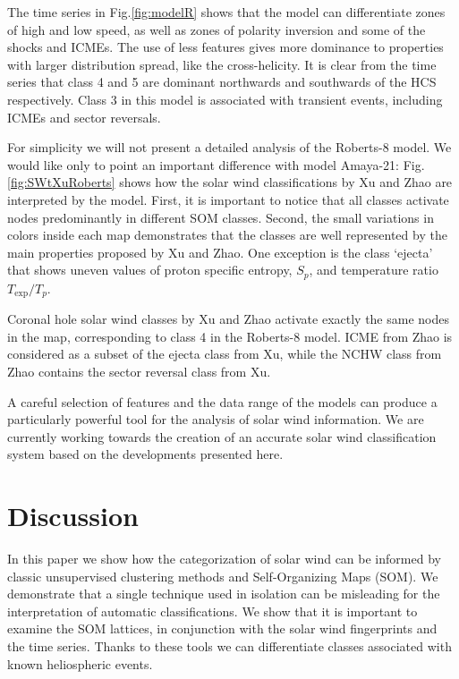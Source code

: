 \documentclass[utf8]{frontiersSCNS} %
\begin{document}
The time series in Fig.\ref{fig:modelR} shows that the model can differentiate zones of high and low speed, as well as zones of polarity inversion and some of the shocks and ICMEs. The use of less features gives more dominance to properties with larger distribution spread, like the cross-helicity. It is clear from the time series that class 4 and 5 are dominant northwards and southwards of the HCS respectively. Class 3 in this model is associated with transient events, including ICMEs and sector reversals.

For simplicity we will not present a detailed analysis of the Roberts-8 model. We would like only to point an important difference with model Amaya-21: Fig.\ref{fig:SWtXuRoberts} shows how the solar wind classifications by Xu and Zhao are interpreted by the model. First, it is important to notice that all classes activate nodes predominantly in different SOM classes. Second, the small variations in colors inside each map demonstrates that the classes are well represented by the main properties proposed by Xu and Zhao. One exception is the class `ejecta' that shows uneven values of proton specific entropy, $S_p$, and temperature ratio $T_{\text{exp}}/T_p$.

Coronal hole solar wind classes by Xu and Zhao activate exactly the same nodes in the map, corresponding to class 4 in the Roberts-8 model. ICME from Zhao is considered as a subset of the ejecta class from Xu, while the NCHW class from Zhao contains the sector reversal class from Xu.

A careful selection of features and the data range of the models can produce a particularly powerful tool for the analysis of solar wind information. We are currently working towards the creation of an accurate solar wind classification system based on the developments presented here.

\section{Discussion}
In this paper we show how the categorization of solar wind can be informed by classic unsupervised clustering methods and Self-Organizing Maps (SOM). We demonstrate that a single technique used in isolation can be misleading for the interpretation of automatic classifications. We show that it is important to examine the SOM lattices, in conjunction with the solar wind fingerprints and the time series. Thanks to these tools we can differentiate classes associated with known heliospheric events.
\end{document}
